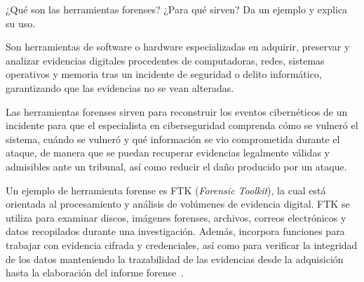 ¿Qué son las herramientas forenses? ¿Para qué sirven? Da un ejemplo y explica su uso.

Son herramientas de software o hardware especializadas en adquirir, preservar y analizar evidencias digitales procedentes de computadoras, redes, sistemas operativos y memoria tras un incidente de seguridad o delito informático, garantizando que las evidencias no se vean alteradas.

Las herramientas forenses sirven para reconstruir los eventos cibernéticos de un incidente para que el especialista en ciberseguridad comprenda cómo se vulneró el sistema, cuándo se vulneró y qué información se vio comprometida durante el ataque, de manera que se puedan recuperar evidencias legalmente válidas y admisibles ante un tribunal, así como reducir el daño producido por un ataque.

Un ejemplo de herramienta forense es FTK (\textit{Forensic Toolkit}), la cual está orientada al procesamiento y análisis de volúmenes de evidencia digital. FTK se utiliza para examinar discos, imágenes forenses, archivos, correos electrónicos y datos recopilados durante una investigación. Además, incorpora funciones para trabajar con evidencia cifrada y credenciales, así como para verificar la integridad de los datos manteniendo la trazabilidad de las evidencias desde la adquisición hasta la elaboración del informe forense~\cite{HF}.
